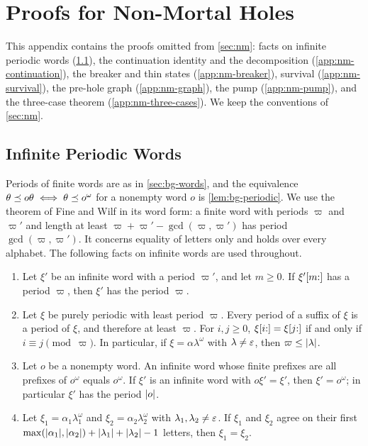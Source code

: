 
\section{Proofs for Non-Mortal Holes}\label{app:nm}\label{app:nonmortal}

This appendix contains the proofs omitted from \cref{sec:nm}: facts on
infinite periodic words (\cref{app:nm-periodic}), the continuation identity and the
decomposition (\cref{app:nm-continuation}), the breaker and thin states
(\cref{app:nm-breaker}), survival (\cref{app:nm-survival}), the pre-hole graph
(\cref{app:nm-graph}), the pump (\cref{app:nm-pump}), and the three-case
theorem (\cref{app:nm-three-cases}). We keep the conventions of
\cref{sec:nm}.

\subsection{Infinite Periodic Words}\label{app:nm-periodic}

Periods of finite words are as in \cref{sec:bg-words}, and the equivalence
$\theta\preceq o\theta\iff\theta\preceq o^\omega$ for a nonempty word $o$ is
\cref{lem:bg-periodic}. We use the theorem of Fine and Wilf
\citep{FineWilf65,Lothaire02} in its word form: a finite word with periods $\varpi$
and $\varpi'$ and length at least $\varpi+\varpi'-\gcd(\varpi,\varpi')$ has period $\gcd(\varpi,\varpi')$. It
concerns equality of letters only and holds over every alphabet. The
following facts on infinite words are used throughout.

\begin{lemma}\label{lem:nm-infinite}
\leavevmode
\begin{enumerate}[label=(\alph*)]
\item Let $\xi'$ be an infinite word with a period $\varpi'$, and let $m\ge0$. If
$\xi'[m{:}]$ has a period $\varpi$, then $\xi'$ has the period $\varpi$.
\item Let $\xi$ be purely periodic with least period $\varpi$. Every period of a
suffix of $\xi$ is a period of $\xi$, and therefore at least $\varpi$. For
$i,j\ge0$, $\xi[i{:}]=\xi[j{:}]$ if and only if $i\equiv j\pmod \varpi$. In
particular, if $\xi=\alpha\lambda^\omega$ with $\lambda\ne\varepsilon$, then
$\varpi\le\lvert \lambda\rvert$.
\item Let $o$ be a nonempty word. An infinite word whose finite prefixes are
all prefixes of $o^\omega$ equals $o^\omega$. If $\xi'$ is an infinite word with
$o\xi'=\xi'$, then $\xi'=o^\omega$; in particular $\xi'$ has the period $\lvert o\rvert$.
\item Let $\xi_1=\alpha_1\lambda_1^\omega$ and $\xi_2=\alpha_2\lambda_2^\omega$
with $\lambda_1,\lambda_2\ne\varepsilon$. If $\xi_1$ and $\xi_2$ agree on their first
$\max(\lvert \alpha_1\rvert,\lvert \alpha_2\rvert)+\lvert \lambda_1\rvert+\lvert \lambda_2\rvert-1$
letters, then $\xi_1=\xi_2$.
\end{enumerate}
\end{lemma}

